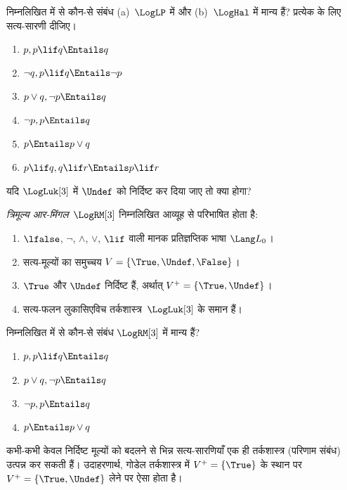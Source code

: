 \documentclass[../../../include/open-logic-section]{subfiles}
\begin{document}
\begin{prob}
  निम्नलिखित में से कौन-से संबंध (a)~$\LogLP$ में और (b)~$\LogHal$ में
  मान्य हैं? प्रत्येक के लिए सत्य-सारणी दीजिए।
  \begin{enumerate}
    \item $p, p \lif q \Entails q$
    \item $\lnot q, p \lif q \Entails \lnot p$
    \item $p \lor q, \lnot p \Entails q$
    \item $\lnot p, p \Entails q$
    \item $p \Entails p \lor q$
    \item $p \lif q, q\lif r \Entails p \lif r$
  \end{enumerate}
\end{prob}

यदि $\LogLuk[3]$ में $\Undef$ को निर्दिष्ट कर दिया जाए तो क्या होगा?

\begin{defn}
  \emph{त्रिमूल्य आर-मिंगल}~$\LogRM[3]$ निम्नलिखित आव्यूह से परिभाषित होता
  है:
  \begin{enumerate}
    \item $\lfalse$, $\lnot$, $\land$, $\lor$, $\lif$ वाली मानक
    प्रतिज्ञप्तिक भाषा $\Lang L_0$।
    \item सत्य-मूल्यों का समुच्चय $V = \{\True, \Undef, \False\}$।
    \item $\True$ और $\Undef$ निर्दिष्ट हैं, अर्थात्
    $V^+ = \{\True, \Undef\}$।
    \item सत्य-फलन लुकासिएविच तर्कशास्त्र~$\LogLuk[3]$ के समान हैं।
  \end{enumerate}
\end{defn}

\begin{prob}
  निम्नलिखित में से कौन-से संबंध $\LogRM[3]$ में मान्य हैं?
  \begin{enumerate}
    \item $p, p \lif q \Entails q$
    \item $p \lor q, \lnot p \Entails q$
    \item $\lnot p, p \Entails q$
    \item $p \Entails p \lor q$
  \end{enumerate}
\end{prob}

कभी-कभी केवल निर्दिष्ट मूल्यों को बदलने से भिन्न सत्य-सारणियाँ एक ही
तर्कशास्त्र (परिणाम संबंध) उत्पन्न कर सकती हैं। उदाहरणार्थ, गोडेल
तर्कशास्त्र में $V^+ = \{\True\}$ के स्थान पर
$V^+ = \{\True, \Undef\}$ लेने पर ऐसा होता है।
\end{document}
